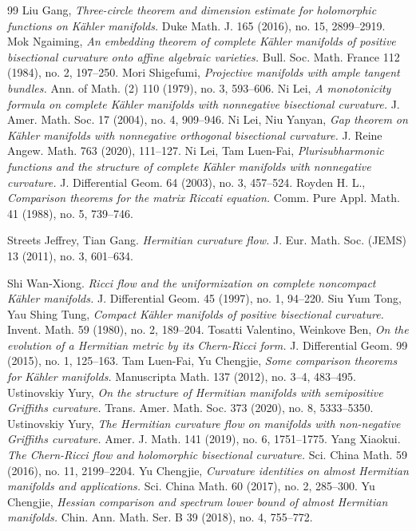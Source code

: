 \documentclass[12pt]{amsart}
\theoremstyle{definition}
\theoremstyle{remark}
\numberwithin{equation}{section}
\begin{document}
\begin{thebibliography}{99}
 Liu Gang, {\sl Three-circle theorem and dimension estimate for holomorphic functions on K\"ahler manifolds.} Duke Math. J. 165 (2016), no. 15, 2899--2919.
Mok Ngaiming, {\sl An embedding theorem of complete K\"ahler manifolds of positive bisectional curvature onto affine algebraic varieties.} Bull. Soc. Math. France 112 (1984), no. 2, 197--250.
Mori Shigefumi, {\sl Projective manifolds with ample tangent bundles.} Ann. of Math. (2) 110 (1979), no. 3, 593--606.
 Ni Lei, {\sl A monotonicity formula on complete K\"ahler manifolds with nonnegative bisectional curvature.} J. Amer. Math. Soc. 17 (2004), no. 4, 909--946.
 Ni Lei, Niu Yanyan, {\sl Gap theorem on K\"ahler manifolds with nonnegative orthogonal bisectional curvature.} J. Reine Angew. Math. 763 (2020), 111--127.
Ni Lei, Tam Luen-Fai, {\sl Plurisubharmonic functions and the structure of complete K\"ahler manifolds with nonnegative curvature.} J. Differential Geom. 64 (2003), no. 3, 457--524.
 Royden H. L., {\sl Comparison theorems for the matrix Riccati equation.} Comm. Pure Appl. Math. 41 (1988), no. 5, 739--746.

Streets Jeffrey, Tian Gang. {\sl Hermitian curvature flow.} J. Eur. Math. Soc. (JEMS) 13 (2011), no. 3, 601--634.

Shi Wan-Xiong. {\sl Ricci flow and the uniformization on complete noncompact K\"ahler manifolds.} J. Differential Geom. 45 (1997), no. 1, 94--220.
Siu Yum Tong, Yau Shing Tung, {\sl Compact K\"ahler manifolds of positive bisectional curvature.} Invent. Math. 59 (1980), no. 2, 189--204.
Tosatti Valentino, Weinkove Ben, {\sl On the evolution of a Hermitian metric by its Chern-Ricci form.} J. Differential Geom. 99 (2015), no. 1, 125--163.
Tam Luen-Fai, Yu Chengjie, {\sl Some comparison theorems for K\"ahler manifolds.} Manuscripta Math. 137 (2012), no. 3--4, 483--495.
Ustinovskiy Yury, {\sl On the structure of Hermitian manifolds with semipositive Griffiths curvature.} Trans. Amer. Math. Soc. 373 (2020), no. 8, 5333--5350.
Ustinovskiy Yury, {\sl The Hermitian curvature flow on manifolds with non-negative Griffiths curvature.} Amer. J. Math. 141 (2019), no. 6, 1751--1775.
 Yang Xiaokui. {\sl The Chern-Ricci flow and holomorphic bisectional curvature.} Sci. China Math. 59 (2016), no. 11, 2199--2204.
 Yu Chengjie, {\sl Curvature identities on almost Hermitian manifolds and applications.} Sci. China Math. 60 (2017), no. 2, 285--300.
Yu Chengjie, {\sl Hessian comparison and spectrum lower bound of almost Hermitian manifolds.} Chin. Ann. Math. Ser. B 39 (2018), no. 4, 755--772.


\end{thebibliography}
\end{document}

